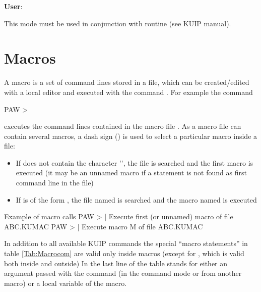 {\bf User}:

This mode must be used in conjunction with routine 
(see KUIP manual).
 
%
%
\newpage
\section{Macros}


A macro is a set of command lines stored in a file,
which can be created/edited with a local editor
and executed with the command . For example the command

\begin{XMP}
PAW > 
\end{XMP}

executes the command lines contained in the macro file .
As a macro file can contain several macros, a dash sign (\Lit{\#})
is used to select a particular macro inside a file:

\begin{itemize}
\item If  does not contain the character '\Lit{#}', the file
      is searched and the first macro is executed (it may be an unnamed
      macro if a  statement is not found as first command
      line in the file)
\item If  is of the form ,
      the file named  is searched and the macro named
       is executed
\end{itemize}
 
\begin{XMPt}{Example of macro calls}
PAW >    | Execute first (or unnamed) macro of file ABC.KUMAC
PAW >  | Execute macro M of file ABC.KUMAC
\end{XMPt}

In addition to all available KUIP commands the 
special ``macro statements'' in table \ref{Tab:Macrocom}
are valid only inside macros (except for , which is valid 
both inside and outside)
In the last line of the table  stands for either 
an argument passed with the command 
(in the command mode or from another macro)
or a local variable of the macro.


